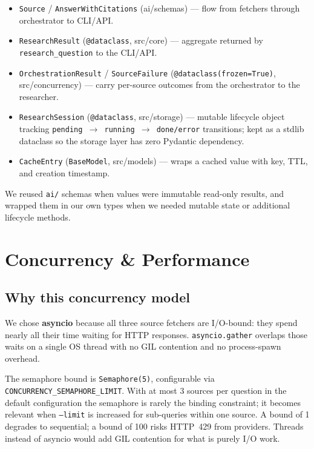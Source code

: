 \documentclass[11pt,a4paper]{article}
\begin{document}
\begin{itemize}[nosep,leftmargin=1.2em]
  \item \texttt{Source} / \texttt{AnswerWithCitations} (ai/schemas) --- flow from fetchers through orchestrator to CLI/API.
  \item \texttt{ResearchResult} (\texttt{@dataclass}, src/core) --- aggregate returned by \texttt{research\_question} to the CLI/API.
  \item \texttt{OrchestrationResult} / \texttt{SourceFailure} (\texttt{@dataclass(frozen=True)}, src/concurrency) --- carry per-source outcomes from the orchestrator to the researcher.
  \item \texttt{ResearchSession} (\texttt{@dataclass}, src/storage) --- mutable lifecycle object tracking \texttt{pending $\to$ running $\to$ done/error} transitions; kept as a stdlib dataclass so the storage layer has zero Pydantic dependency.
  \item \texttt{CacheEntry} (\texttt{BaseModel}, src/models) --- wraps a cached value with key, TTL, and creation timestamp.
\end{itemize}

We reused \texttt{ai/} schemas when values were immutable read-only results, and wrapped them in our own types when we needed mutable state or additional lifecycle methods.

\section{Concurrency \& Performance}\label{sec:concurrency}

\subsection{Why this concurrency model}

We chose \textbf{asyncio} because all three source fetchers are I/O-bound: they spend nearly all their time waiting for HTTP responses. \texttt{asyncio.gather} overlaps those waits on a single OS thread with no GIL contention and no process-spawn overhead.

The semaphore bound is \texttt{Semaphore(5)}, configurable via \texttt{CONCURRENCY\_SEMAPHORE\_LIMIT}. With at most 3 sources per question in the default configuration the semaphore is rarely the binding constraint; it becomes relevant when \texttt{--limit} is increased for sub-queries within one source. A bound of 1 degrades to sequential; a bound of 100 risks HTTP~429 from providers. Threads instead of asyncio would add GIL contention for what is purely I/O work.
\end{document}
